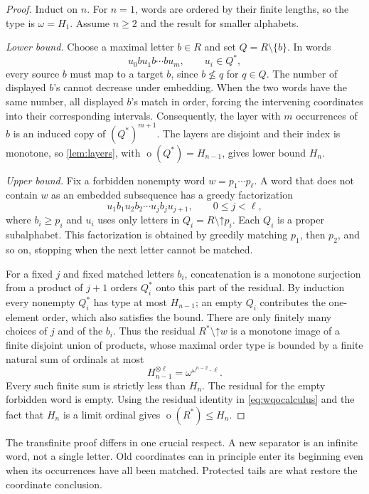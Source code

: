 \documentclass[11pt,letterpaper]{article}
\theoremstyle{definition}
\theoremstyle{remark}
\newcommand{\otp}{\operatorname{o}}
\newcommand{\up}{\mathord{\uparrow}}
\begin{document}
\begin{proof}
Induct on $n$. For $n=1$, words are ordered by their finite lengths, so
the type is $\omega=H_1$.
Assume $n\ge2$ and the result for smaller alphabets.

\emph{Lower bound.} Choose a maximal letter $b\in R$ and set
$Q=R\setminus\{b\}$. In words
\[
  u_0 b u_1 b\cdots b u_m,\qquad u_i\in Q^*,
\]
every source $b$ must map to a target $b$, since $b\not\le q$ for
$q\in Q$. The number of displayed $b$'s cannot decrease under embedding.
When the two words have the same number, all displayed $b$'s match in
order, forcing the intervening coordinates into their corresponding
intervals. Consequently, the layer with $m$ occurrences of $b$ is an
induced copy of $(Q^*)^{m+1}$. The layers are disjoint and their index is
monotone, so \cref{lem:layers}, with $\otp(Q^*)=H_{n-1}$, gives lower
bound $H_n$.

\emph{Upper bound.} Fix a forbidden nonempty word
$w=p_1\cdots p_\ell$. A word that does not contain $w$ as an embedded
subsequence has a greedy factorization
\[
  u_1 b_1 u_2 b_2\cdots u_j b_j u_{j+1},\qquad 0\le j<\ell,
\]
where $b_i\ge p_i$ and $u_i$ uses only letters in
$Q_i=R\setminus\up p_i$. Each $Q_i$ is a proper subalphabet.
This factorization is obtained by greedily matching $p_1$, then $p_2$,
and so on, stopping when the next letter cannot be matched.

For a fixed $j$ and fixed matched letters $b_i$, concatenation is a
monotone surjection from a product of $j+1$ orders $Q_i^*$ onto this
part of the residual. By induction every nonempty $Q_i^*$ has type at
most $H_{n-1}$; an empty $Q_i$ contributes the one-element order,
which also satisfies the bound. There are only finitely many choices
of $j$ and of the $b_i$. Thus the residual
$R^*\setminus\up w$ is a monotone image of a finite disjoint union of
products, whose maximal order type is bounded by a finite natural sum
of ordinals at most
\[
  H_{n-1}^{\otimes\ell}
  =\omega^{\omega^{n-2}\cdot\ell}.
\]
Every such finite sum is strictly less than $H_n$.
The residual for the empty forbidden word is empty.
Using the residual identity in \eqref{eq:wqocalculus} and the fact that
$H_n$ is a limit ordinal gives $\otp(R^*)\le H_n$.
\end{proof}

The transfinite proof differs in one crucial respect. A new separator
is an infinite word, not a single letter. Old coordinates can in
principle enter its beginning even when its occurrences have all been
matched. Protected tails are what restore the coordinate conclusion.
\end{document}
